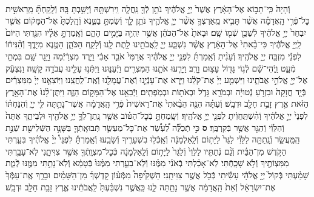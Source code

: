 \documentclass[twoside, openany, parskip=half, 11pt]{book}
\begin{document}
\begin{footnotesize}
\begin{multicols}{2}
\\
וְֿהָיָה֙ כִּֽי־תָב֣וֹא אֶל־הָאָ֔רֶץ אֲשֶׁר֙ יְיָ֣ אֱלֹהֶ֔יךָ נֹתֵ֥ן לְֿךָ֖ נַֽחֲלָ֑ה וִֽירִשְׁתָּ֖הּ וְֿיָשַׁ֥בְתָּ בָּֽהּ׃ וְֿלָֽקַחְתָּ֞ מֵֽרֵאשִׁ֣ית כׇּל־פְּֿרִ֣י הָֽאֲדָמָ֗ה אֲשֶׁ֨ר תָּבִ֧יא מֵֽאַרְצְךָ֛ אֲשֶׁ֨ר יְיָ֧ אֱלֹהֶ֛יךָ נֹתֵ֥ן לָ֖ךְ וְֿשַׂמְתָּ֣ בַטֶּ֑נֶא וְֿהָֽלַכְתָּ֙ אֶל־הַמָּק֔וֹם אֲשֶׁ֤ר יִבְחַר֙ יְיָ֣ אֱלֹהֶ֔יךָ לְֿשַׁכֵּ֥ן שְֿׁמ֖וֹ שָֽׁם׃ וּבָאתָ֙ אֶל־הַכֹּהֵ֔ן אֲשֶׁ֥ר יִֽהְיֶ֖ה בַּיָּמִ֣ים הָהֵ֑ם וְֿאָֽמַרְתָּ֣ אֵלָ֗יו הִגַּ֤דְתִּי הַיּוֹם֙ לַֽיְיָ֣ אֱלֹהֶ֔יךָ כִּי־בָ֨אתִי֙ אֶל־הָאָ֔רֶץ אֲשֶׁ֨ר נִשְׁבַּ֧ע יְיָ֛ לַֽאֲבֹתֵ֖ינוּ לָ֥תֶת לָֽנוּ׃
וְֿלָקַ֧ח הַכֹּהֵ֛ן הַטֶּ֖נֶא מִיָּדֶ֑ךָ וְֿהִ֨נִּיח֔וֹ לִפְנֵ֕י מִזְבַּ֖ח יְיָ֥ אֱלֹהֶֽיךָ׃ וְֿעָנִ֨יתָ וְֿאָֽמַרְתָּ֜ לִפְנֵ֣י יְיָ֣ אֱלֹהֶ֗יךָ אֲרַמִּי֙ אֹבֵ֣ד אָבִ֔י וַיֵּ֣רֶד מִצְרַ֔יְֿמָה וַיָּ֥גָר שָׁ֖ם בִּמְתֵ֣י מְֿעָ֑ט וַֽיְֿהִי־שָׁ֕ם לְֿג֥וֹי גָּד֖וֹל עָצ֥וּם וָרָֽב׃ וַיָּרֵ֧עוּ אֹתָ֛נוּ הַמִּצְרִ֖ים וַיְֿעַנּ֑וּנוּ וַיִּתְּֿנ֥וּ עָלֵ֖ינוּ עֲבֹדָ֥ה קָשָֽׁה׃ וַנִּצְעַ֕ק אֶל־יְיָ֖ אֱלֹהֵ֣י אֲבֹתֵ֑ינוּ וַיִּשְׁמַ֤ע יְיָ֙ אֶת־קֹלֵ֔נוּ וַיַּ֧רְא אֶת־עָנְֿיֵ֛נוּ וְֿאֶת־עֲמָלֵ֖נוּ וְֿאֶֽת־לַֽחֲצֵֽנוּ׃ וַיּֽוֹצִאֵ֤נוּ יְיָ֙ מִמִּצְרַ֔יִם בְּֿיָ֤ד חֲזָקָה֙ וּבִזְרֹ֣עַ נְֿטוּיָ֔ה וּבְמֹרָ֖א גָּדֹ֑ל וּבְאֹת֖וֹת וּבְמֹֽפְתִֽים׃ וַיְֿבִאֵ֖נוּ אֶל־הַמָּק֣וֹם הַזֶּ֑ה וַיִּתֶּן־לָ֨נוּ֙ אֶת־הָאָ֣רֶץ הַזֹּ֔את אֶ֛רֶץ זָבַ֥ת חָלָ֖ב וּדְבָֽשׁ׃ וְֿעַתָּ֗ה הִנֵּ֤ה הֵבֵ֨אתִי֙ אֶת־רֵאשִׁית֙ פְּֿרִ֣י הָֽאֲדָמָ֔ה אֲשֶׁר־נָתַ֥תָּה לִּ֖י יְיָ֑ וְֿהִנַּחְתּ֗וֹ לִפְנֵי֙ יְיָ֣ אֱלֹהֶ֔יךָ וְֿהִ֨שְׁתַּֽחֲוִ֔יתָ לִפְנֵ֖י יְיָ֥ אֱלֹהֶֽיךָ׃ וְֿשָֽׂמַחְתָּ֣ בְֿכׇל־הַטּ֗וֹב אֲשֶׁ֧ר נָֽתַן־לְךָ֛ יְיָ֥ אֱלֹהֶ֖יךָ וּלְבֵיתֶ֑ךָ אַתָּה֙ וְֿהַלֵּוִ֔י וְֿהַגֵּ֖ר אֲשֶׁ֥ר בְּֿקִרְבֶּֽךָ׃ \textbf{ס}
כִּ֣י תְֿכַלֶּ֞ה לַ֠עְשֵׂ֠ר אֶת־כׇּל־מַעְשַׂ֧ר תְּֿבוּאָֽתְֿךָ֛ בַּשָּׁנָ֥ה הַשְּֿׁלִישִׁ֖ת שְֿׁנַ֣ת הַֽמַּֽעֲשֵׂ֑ר וְֿנָֽתַתָּ֣ה לַלֵּוִ֗י לַגֵּר֙ לַיָּת֣וֹם וְֿלָֽאַלְמָנָ֔ה וְֿאָֽכְֿל֥וּ בִשְׁעָרֶ֖יךָ וְֿשָׂבֵֽעוּ׃ וְֿאָֽמַרְתָּ֡ לִפְנֵי֩ יְיָ֨ אֱלֹהֶ֜יךָ בִּעַ֧רְתִּי הַקֹּ֣דֶשׁ מִן־הַבַּ֗יִת וְֿגַ֨ם נְֿתַתִּ֤יו לַלֵּוִי֙ וְֿלַגֵּר֙ לַיָּת֣וֹם וְֿלָֽאַלְמָנָ֔ה כְּֿכׇל־מִצְוָֽתְֿךָ֖ אֲשֶׁ֣ר צִוִּיתָ֑נִי לֹֽא־עָבַ֥רְתִּי מִמִּצְוֹתֶ֖יךָ וְֿלֹ֥א שָׁכָֽחְֿתִּי׃ לֹֽא־אָכַ֨לְתִּי בְֿאֹנִ֜י מִמֶּ֗נּוּ וְֿלֹֽא־בִעַ֤רְתִּי מִמֶּ֨נּוּ֙ בְּֿטָמֵ֔א וְֿלֹֽא־נָתַ֥תִּי מִמֶּ֖נּוּ לְֿמֵ֑ת שָׁמַ֗עְתִּי בְּֿקוֹל֙ יְיָ֣ אֱלֹהָ֔י עָשִׂ֕יתִי כְּֿכֹ֖ל אֲשֶׁ֥ר צִוִּיתָֽנִי׃ הַשְׁקִ֩יפָה֩ מִמְּֿע֨וֹן קׇדְשְׁךָ֜ מִן־הַשָּׁמַ֗יִם וּבָרֵ֤ךְ אֶֽת־עַמְּֿךָ֙ אֶת־יִשְׂרָאֵ֔ל וְֿאֵת֙ הָֽאֲדָמָ֔ה אֲשֶׁ֥ר נָתַ֖תָּה לָ֑נוּ כַּֽאֲשֶׁ֤ר נִשְׁבַּ֨עְתָּ֙ לַֽאֲבֹתֵ֔ינוּ אֶ֛רֶץ זָבַ֥ת חָלָ֖ב וּדְבָֽשׁ׃


\end{multicols}
\end{footnotesize}
\end{document}
